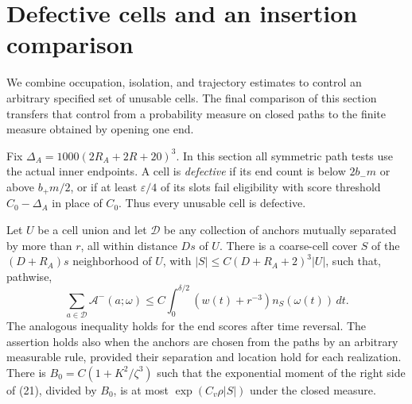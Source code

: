 \section{Defective cells and an insertion comparison}\label{sec:defects}

We combine occupation, isolation, and trajectory estimates to control
an arbitrary specified set of unusable cells. The final comparison
of this section transfers that control from a probability measure
on closed paths to the finite measure obtained by opening one end.

Fix
$\Delta_A=1000(2R_A+2R+20)^3$.
In this section all symmetric path tests use the actual inner
endpoints. A cell is \emph{defective} if its end count is below
$2b_-m$ or above $b_+m/2$, or if at least $\varepsilon/4$ of its
slots fail eligibility with score threshold $C_0-\Delta_A$
in place of $C_0$. Thus every unusable cell is defective.

\begin{lemma}\label{lem:anchor-scores}
Let $U$ be a cell union and let $\mathcal D$ be any collection of
anchors mutually separated by more than $r$, all within distance
$Ds$ of $U$. There is a coarse-cell cover $S$ of the
$(D+R_A)s$ neighborhood of $U$, with
$|S|\leq C(D+R_A+2)^3|U|$, such that, pathwise,
\begin{equation}
 \sum_{a\in\mathcal D}\mathcal A^-(a;\omega)
 \leq C\int_0^{\delta/2}(w(t)+r^{-3})n_S(\omega(t))\,dt.
 \tag{21}\label{eq:21}
\end{equation}
The analogous inequality holds for the end scores after time
reversal. The assertion holds also when the anchors are chosen
from the paths by an arbitrary measurable rule, provided their
separation and location hold for each realization.
There is $B_0=C(1+K^2/\zeta^3)$ such that the exponential moment
of the right side of (21), divided by $B_0$, is at most
$\exp(C_v\rho|S|)$ under the closed measure.
\end{lemma}

